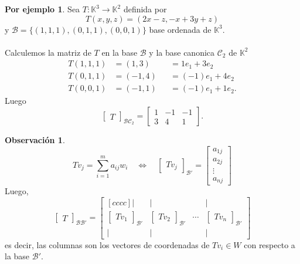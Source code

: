 \documentclass{article}
\theoremstyle{definition}
\theoremstyle{definition}
\newtheorem*{obs}{Observación}
\newtheorem*{ej}{Por ejemplo}
\theoremstyle{remark}
\begin{document}
\begin{ej}
  Sea $T : \mathbb{K}^3 \to \mathbb{K}^2$ definida por \[
T(x,y,z)=(2x-z,-x+3y+z)
  \]
  y $\mathcal{B}=\{(1,1,1),(0,1,1),(0,0,1)\}$ base ordenada de $\mathbb{K}^3$. \\\\ Calculemos la matriz de $T$ en la base $\mathcal{B}$ y la base canonica $\mathcal{C}_2$ de $\mathbb{K}^2$ \[
    \begin{aligned}
      T(1,1,1)&=(1,3)&&=1e_1+3e_2 \\
      T(0,1,1)&=(-1,4)&&=(-1)e_1+4e_2 \\
      T(0,0,1)&=(-1,1)&&=(-1)e_1+1e_2.
    \end{aligned}
  \] 
  Luego  \[
    \begin{bmatrix} T \end{bmatrix}_{\mathcal{B}{\mathcal{C}_2}}=\begin{bmatrix} 1 & -1 & -1 \\ 3 & 4 & 1 \end{bmatrix}.
  \]
\end{ej}
\begin{obs}
  \[
    Tv_j=\sum_{i=1}^ma_{ij}w_{i} \quad \Leftrightarrow \quad \begin{bmatrix}Tv_j\end{bmatrix}_{\mathcal{B}'}=\begin{bmatrix}a_{1j} \\ a_{2j} \\ \vdots \\ a_{nj} \end{bmatrix}
  \]
  Luego, \[
    \begin{bmatrix} T \end{bmatrix}_{\mathcal{B} \mathcal{B}'} = \begin{bmatrix}[cccc] | & | & & | \\ 
    \begin{bmatrix} T v_1 \end{bmatrix}_{\mathcal{B}'} & \begin{bmatrix} T v_2 \end{bmatrix}_{\mathcal{B}'} & \cdots & \begin{bmatrix} T v_n \end{bmatrix}_{\mathcal{B}'} \\
  | & | & & | \end{bmatrix}
  \]
  es decir, las columnas son los vectores de coordenadas de $Tv_i \in W$ con respecto a la base $\mathcal{B}'$.
\end{obs}
\end{document}
